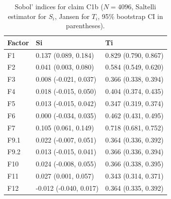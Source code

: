 \begin{table}[ht]
\centering
\caption{Sobol' indices for claim C1b ($N=4096$, Saltelli estimator for $S_i$, Jansen for $T_i$, 95\% bootstrap CI in parentheses).} 
\label{tab:sobol_C1b}
\begin{tabular}{lll}
  \hline
Factor & Si & Ti \\ 
  \hline
F1 & 0.137 (0.089, 0.184) & 0.829 (0.790, 0.867) \\ 
  F2 & 0.041 (0.003, 0.080) & 0.584 (0.549, 0.620) \\ 
  F3 & 0.008 (-0.021, 0.037) & 0.366 (0.338, 0.394) \\ 
  F4 & 0.018 (-0.015, 0.050) & 0.404 (0.374, 0.435) \\ 
  F5 & 0.013 (-0.015, 0.042) & 0.347 (0.319, 0.374) \\ 
  F6 & 0.000 (-0.034, 0.035) & 0.462 (0.431, 0.495) \\ 
  F7 & 0.105 (0.061, 0.149) & 0.718 (0.681, 0.752) \\ 
  F9.1 & 0.022 (-0.007, 0.051) & 0.364 (0.336, 0.392) \\ 
  F9.2 & 0.013 (-0.015, 0.041) & 0.366 (0.336, 0.394) \\ 
  F10 & 0.024 (-0.008, 0.055) & 0.366 (0.338, 0.395) \\ 
  F11 & 0.027 (0.001, 0.057) & 0.343 (0.314, 0.371) \\ 
  F12 & -0.012 (-0.040, 0.017) & 0.364 (0.335, 0.392) \\ 
   \hline
\end{tabular}
\end{table}
